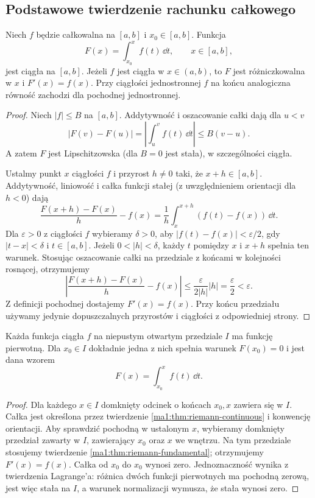 \subsection{Podstawowe twierdzenie rachunku całkowego}
\begin{twierdzenie}
\label{ma1:thm:riemann-fundamental}
Niech $f$ będzie całkowalna na $[a,b]$ i $x_0\in[a,b]$. Funkcja
\[
 F(x)=\int_{x_0}^x f(t)\,\dd t,\qquad x\in[a,b],
\]
jest ciągła na $[a,b]$. Jeżeli $f$ jest ciągła w $x\in(a,b)$, to $F$ jest różniczkowalna w $x$ i $F'(x)=f(x)$. Przy ciągłości jednostronnej $f$ na końcu analogiczna równość zachodzi dla pochodnej jednostronnej.
\end{twierdzenie}
\begin{proof}
Niech $|f|\le B$ na $[a,b]$. Addytywność i oszacowanie całki dają dla $u<v$
\[
 |F(v)-F(u)|=\left|\int_u^v f(t)\,\dd t\right|\le B(v-u).
\]
A zatem $F$ jest Lipschitzowska (dla $B=0$ jest stała), w szczególności ciągła.

Ustalmy punkt $x$ ciągłości $f$ i przyrost $h\ne0$ taki, że $x+h\in[a,b]$. Addytywność, liniowość i całka funkcji stałej (z uwzględnieniem orientacji dla $h<0$) dają
\[
 \frac{F(x+h)-F(x)}h-f(x)
 =\frac1h\int_x^{x+h}(f(t)-f(x))\,\dd t.
\]
Dla $\varepsilon>0$ z ciągłości $f$ wybieramy $\delta>0$, aby $|f(t)-f(x)|<\varepsilon/2$, gdy $|t-x|<\delta$ i $t\in[a,b]$. Jeżeli $0<|h|<\delta$, każdy $t$ pomiędzy $x$ i $x+h$ spełnia ten warunek. Stosując oszacowanie całki na przedziale z końcami w kolejności rosnącej, otrzymujemy
\[
 \left|\frac{F(x+h)-F(x)}h-f(x)\right|
 \le\frac{\varepsilon}{2|h|}|h|=\frac{\varepsilon}{2}<\varepsilon.
\]
Z definicji pochodnej dostajemy $F'(x)=f(x)$. Przy końcu przedziału używamy jedynie dopuszczalnych przyrostów i ciągłości z odpowiedniej strony.
\end{proof}
\begin{wniosek}
\label{ma1:cor:continuous-primitive-existence}
Każda funkcja ciągła $f$ na niepustym otwartym przedziale $I$ ma funkcję pierwotną. Dla $x_0\in I$ dokładnie jedna z nich spełnia warunek $F(x_0)=0$ i jest dana wzorem
\[
 F(x)=\int_{x_0}^x f(t)\,\dd t.
\]
\end{wniosek}
\begin{proof}
Dla każdego $x\in I$ domknięty odcinek o końcach $x_0,x$ zawiera się w $I$. Całka jest określona przez twierdzenie \ref{ma1:thm:riemann-continuous} i konwencję orientacji. Aby sprawdzić pochodną w ustalonym $x$, wybieramy domknięty przedział zawarty w $I$, zawierający $x_0$ oraz $x$ we wnętrzu. Na tym przedziale stosujemy twierdzenie \ref{ma1:thm:riemann-fundamental}; otrzymujemy $F'(x)=f(x)$. Całka od $x_0$ do $x_0$ wynosi zero. Jednoznaczność wynika z twierdzenia Lagrange'a: różnica dwóch funkcji pierwotnych ma pochodną zerową, jest więc stała na $I$, a warunek normalizacji wymusza, że stała wynosi zero.
\end{proof}


